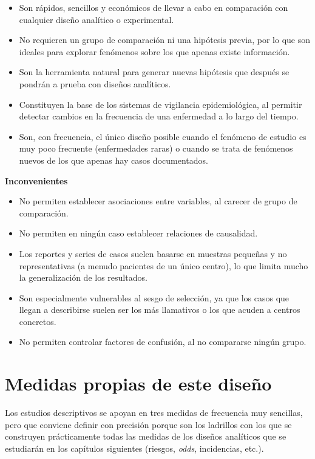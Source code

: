 \documentclass[
  spanish,
  a4paper,
]{scrreport}
\providecommand{\tightlist}{%
  \setlength{\itemsep}{0pt}\setlength{\parskip}{0pt}}
\theoremstyle{definition}
\theoremstyle{definition}
\theoremstyle{remark}
\begin{document}
\begin{itemize}
\tightlist
\item
  Son rápidos, sencillos y económicos de llevar a cabo en comparación
  con cualquier diseño analítico o experimental.
\item
  No requieren un grupo de comparación ni una hipótesis previa, por lo
  que son ideales para explorar fenómenos sobre los que apenas existe
  información.
\item
  Son la herramienta natural para generar nuevas hipótesis que después
  se pondrán a prueba con diseños analíticos.
\item
  Constituyen la base de los sistemas de vigilancia epidemiológica, al
  permitir detectar cambios en la frecuencia de una enfermedad a lo
  largo del tiempo.
\item
  Son, con frecuencia, el único diseño posible cuando el fenómeno de
  estudio es muy poco frecuente (enfermedades raras) o cuando se trata
  de fenómenos nuevos de los que apenas hay casos documentados.
\end{itemize}

\textbf{Inconvenientes}

\begin{itemize}
\tightlist
\item
  No permiten establecer asociaciones entre variables, al carecer de
  grupo de comparación.
\item
  No permiten en ningún caso establecer relaciones de causalidad.
\item
  Los reportes y series de casos suelen basarse en muestras pequeñas y
  no representativas (a menudo pacientes de un único centro), lo que
  limita mucho la generalización de los resultados.
\item
  Son especialmente vulnerables al sesgo de selección, ya que los casos
  que llegan a describirse suelen ser los más llamativos o los que
  acuden a centros concretos.
\item
  No permiten controlar factores de confusión, al no compararse ningún
  grupo.
\end{itemize}

\section{Medidas propias de este
diseño}\label{medidas-propias-de-este-diseuxf1o}

Los estudios descriptivos se apoyan en tres medidas de frecuencia muy
sencillas, pero que conviene definir con precisión porque son los
ladrillos con los que se construyen prácticamente todas las medidas de
los diseños analíticos que se estudiarán en los capítulos siguientes
(riesgos, \emph{odds}, incidencias, etc.).
\end{document}
